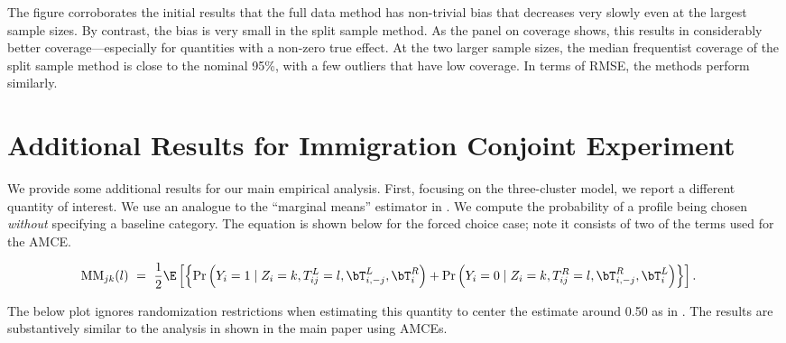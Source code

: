 The figure corroborates the initial results that the full data method has non-trivial bias that decreases very slowly even at the largest sample sizes. By contrast, the bias is very small in the split sample method. As the panel on coverage shows, this results in considerably better coverage---especially for quantities with a non-zero true effect. At the two larger sample sizes, the median frequentist coverage of the split sample method is close to the nominal 95\%, with a few outliers that have low coverage. In terms of RMSE, the methods perform similarly.


\section{Additional Results for Immigration Conjoint Experiment}
\label{app:emp_marg_means}

We provide some additional results for our main empirical analysis. First, focusing on the three-cluster model, we report a different quantity of interest. We use an analogue to the ``marginal means'' estimator in \cite{leeper2020measuring}. We compute the probability of a profile being chosen \emph{without} specifying a baseline category. The equation is shown below for the forced choice case; note it consists of two of the terms used for the AMCE. 

\begin{align}
\mathrm{MM}_{jk}(l) & \ = \ \frac{1}{2}\E \left[
\left\{\Pr\left(Y_i = 1 \mid Z_i=k, T^L_{ij}=l,
\bT^L_{i,-j}, \bT^R_{i}\right) + \Pr\left(Y_i = 0 \mid Z_i=k, T^R_{ij}=l,
\bT^R_{i,-j}, \bT^L_{i}\right)
\right\}\right]. 
\end{align}

The below plot ignores randomization restrictions when estimating this quantity to center the estimate around 0.50 as in \cite{leeper2020measuring}. The results are substantively similar to the analysis in shown in the main paper using AMCEs.

